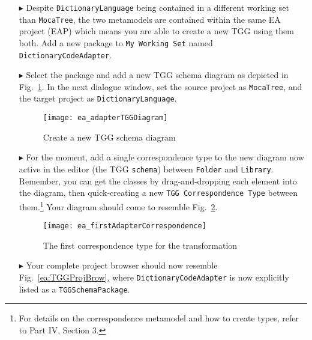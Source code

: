 \begin{itemize}

\item[$\blacktriangleright$] Despite \texttt{DictionaryLanguage} being contained in a different working set than \texttt{MocaTree}, the two
metamodels are contained within the same EA project (EAP) which means you are able to create a new TGG using them both. Add a new package to \texttt{My
Working Set} named \texttt{Dict\-ion\-ary\-Code\-Adap\-ter}.

\item[$\blacktriangleright$] Select the package and add a new TGG schema diagram as depicted in Fig.~\ref{ea:newTGGDiagram}. In the next dialogue window,
set the source project as \texttt{MocaTree}, and the target project as \texttt{Dict\-ion\-ary\-Lang\-uage}.

\begin{figure}[h!]
\begin{center}
  \texttt{[image: ea\_adapterTGGDiagram]}
  \caption{Create a new TGG schema diagram}
  \label{ea:newTGGDiagram}
\end{center}
\end{figure}

\item[$\blacktriangleright$] For the moment, add a single correspondence type to the new diagram now active in the editor (the TGG \texttt{schema}) between
\texttt{Folder} and \texttt{Library}. Remember, you can get the classes by drag-and-dropping each element into the diagram, then quick-creating a new
\texttt{TGG Correspondence Type} between them.\footnote{For details on the correspondence metamodel and how to create types, refer to Part IV, Section 3.} Your diagram
should come to resemble Fig.~\ref{ea:firstCorrType}.

\vspace{0.5cm}

\begin{figure}[htpb]
\begin{center}
  \texttt{[image: ea\_firstAdapterCorrespondence]}
  \caption{The first correspondence type for the transformation}
  \label{ea:firstCorrType}
\end{center}
\end{figure}

\newpage

\item[$\blacktriangleright$] Your complete project browser should now resemble Fig.~\ref{ea:TGGProjBrow}, where \texttt{Dict\-ion\-ary\-Code\-Adap\-ter} is now
explicitly listed as a \texttt{TGGSchemaPackage}.


\end{itemize}
